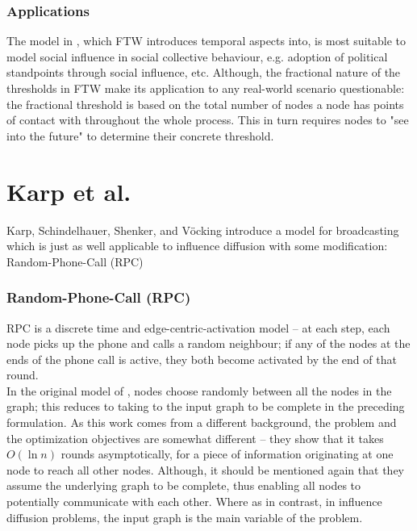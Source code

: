\documentclass[twocolumn, 10pt]{article}
\begin{document}
\subsubsection{Applications}
The model in \cite{duncan}, which FTW introduces temporal aspects into, is most suitable to model social influence in social collective behaviour, e.g. adoption of political standpoints through social influence, etc. Although, the fractional nature of the thresholds in FTW make its application to any real-world scenario questionable: the fractional threshold is based on the total number of nodes a node has points of contact with throughout the whole process. This in turn requires nodes to "see into the future" to determine their concrete threshold.
\section{Karp et al. \cite{karp}}
Karp, Schindelhauer, Shenker, and V\"ocking introduce a model for broadcasting which is just as well applicable to influence diffusion with some modification: Random-Phone-Call (RPC)
\subsubsection{Random-Phone-Call (RPC)}
RPC is a discrete time and edge-centric-activation model -- at each step, each node picks up the phone and calls a random neighbour; if any of the nodes at the ends of the phone call is active, they both become activated by the end of that round. \\
In the original model of \cite{karp}, nodes choose randomly between all the nodes in the graph; this reduces to taking to the input graph to be complete in the preceding formulation. As this work comes from a different background, the problem and the optimization objectives are somewhat different -- they show that it takes $O(\ln n)$ rounds asymptotically, for a piece of information originating at one node to reach all other nodes. Although, it should be mentioned again that they assume the underlying graph to be complete, thus enabling all nodes to potentially communicate with each other. Where as in contrast, in influence diffusion problems, the input graph is the main variable of the problem.
\end{document}
